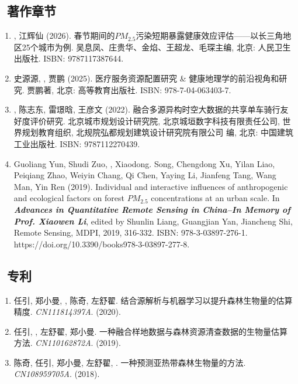 \subsection*{\texorpdfstring{\faBook\ 著作章节}{著作章节}}
\begin{enumerate}
\item
    {}, 江辉仙 (2026).
    春节期间的$PM_{2.5}$污染短期暴露健康效应评估——以长三角地区25个城市为例. 
    \textbf{} \space 吴息凤、庄贵华、金焰、王超龙、毛琛\space 主编, 北京: 人民卫生出版社. 
    ISBN: 9787117387644.
\item
    史源源, {}, 贾鹏 (2025).
    医疗服务资源配置研究 \& 健康地理学的前沿视角和研究. 
    \textbf{} \space 贾鹏\space 著, 北京: 高等教育出版社. 
    ISBN: 978-7-04-063403-7.
\item
    {}, 陈志东, 雷璟晗, 王彦文 (2022).
    融合多源异构时空大数据的共享单车骑行友好度评价研究. 
    \textbf{} \space 北京城市规划设计研究院, 北京城垣数字科技有限责任公司, 世界规划教育组织, 北规院弘都规划建筑设计研究院有限公司 \space 编, 北京: 中国建筑工业出版社. 
    ISBN: 9787112270439. 
\item
    Guoliang Yun, Shudi Zuo, \Shaoqing, Xiaodong. Song, Chengdong Xu, Yilan Liao, Peiqiang Zhao, Weiyin Chang, Qi Chen, Yaying Li, Jianfeng Tang, Wang Man, Yin Ren (2019).
	Individual and interactive influences of anthropogenic and ecological factors on forest $PM_{2.5}$ concentrations at an urban scale. 
    In \textbf{\textit{Advances in Quantitative Remote Sensing in China–In Memory of Prof. Xiaowen Li}}, 
    edited by Shunlin Liang, Guangjian Yan, Jiancheng Shi, Remote Sensing, MDPI, 2019, 316-332. ISBN: 978-3-03897-276-1.
    https://doi.org/10.3390/books978-3-03897-277-8. 
\end{enumerate}

\subsection*{\texorpdfstring{\faBook\ 专利}{专利}}
\begin{enumerate}
\item
     任引, 郑小曼, {}, 陈奇, 左舒翟.
     结合源解析与机器学习以提升森林生物量的估算精度.
     \textit{CN111814397A}. (2020).
\item
     任引, {}, 左舒翟, 郑小曼.
     一种融合样地数据与森林资源清查数据的生物量估算方法.
     \textit{CN110162872A}. (2019).
\item
     陈奇, 任引, 郑小曼, 左舒翟, {}.
     一种预测亚热带森林生物量的方法.
     \textit{CN108959705A}. (2018).
\end{enumerate}

